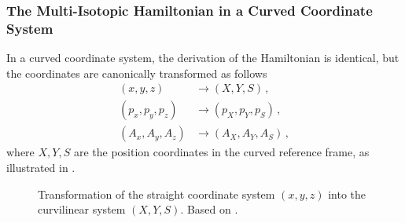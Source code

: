 \subsubsection{The Multi-Isotopic Hamiltonian in a Curved Coordinate System}
In a curved coordinate system, the derivation of the Hamiltonian is identical, but the coordinates are canonically transformed as follows
\begin{align}
  (x,y,z) &\rightarrow (X,Y,S) \, , \\ 
  (p_x,p_y, p_z ) &\rightarrow (p_X,p_Y,p_S) \, , \\ 
  (A_x,A_y,A_z) & \rightarrow (A_X, A_Y, A_S) \, ,
\end{align}
where $X,Y,S$ are the position coordinates in the curved reference frame, as illustrated in .
%
%
%
\begin{figure}[t]  
  \centering
{}
  \caption{Transformation of the straight coordinate system $(x,y,z)$ into the curvilinear system $(X,Y,S)$. Based on \cite{wolski2014beam}.}
  \label{pic:15041799}
  \end{figure}
